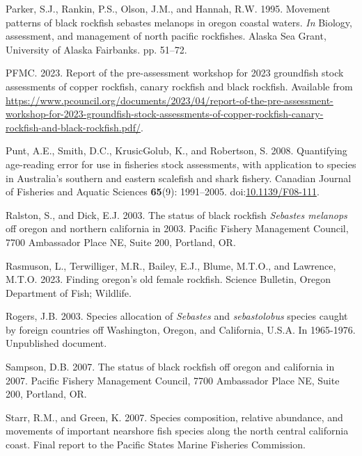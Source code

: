 \documentclass[11pt,
  english,
  letterpaper,
]{article}
\newlength{\cslhangindent}
\newenvironment{CSLReferences}[2] %
 {%
  \setlength{\parindent}{0pt}
  \ifodd #1 \everypar{\setlength{\hangindent}{\cslhangindent}}\ignorespaces\fi
  \ifnum #2 > 0
  \setlength{\parskip}{#2\baselineskip}
  \fi
 }%
 {}
\begin{document}
\begin{CSLReferences}{1}{0}
\leavevmode{}%
Parker, S.J., Rankin, P.S., Olson, J.M., and Hannah, R.W. 1995. Movement patterns of black rockfish sebastes melanops in oregon coastal waters. \emph{In} Biology, assessment, and management of north pacific rockfishes. Alaska Sea Grant, University of Alaska Fairbanks. pp. 51--72.

\leavevmode{}%
PFMC. 2023. Report of the pre-assessment workshop for 2023 groundfish stock assessments of copper rockfish, canary rockfish and black rockfish. Available from \url{https://www.pcouncil.org/documents/2023/04/report-of-the-pre-assessment-workshop-for-2023-groundfish-stock-assessments-of-copper-rockfish-canary-rockfish-and-black-rockfish.pdf/}.

\leavevmode{}%
Punt, A.E., Smith, D.C., KrusicGolub, K., and Robertson, S. 2008. Quantifying age-reading error for use in fisheries stock assessments, with application to species in {A}ustralia's southern and eastern scalefish and shark fishery. Canadian Journal of Fisheries and Aquatic Sciences \textbf{65}(9): 1991--2005. doi:\href{https://doi.org/10.1139/F08-111}{10.1139/F08-111}.

\leavevmode{}%
Ralston, S., and Dick, E.J. 2003. The status of black rockfish \emph{{Sebastes} melanops} off oregon and northern california in 2003. Pacific Fishery Management Council, 7700 Ambassador Place NE, Suite 200, Portland, OR.

\leavevmode{}%
Rasmuson, L., Terwilliger, M.R., Bailey, E.J., Blume, M.T.O., and Lawrence, M.T.O. 2023. Finding oregon's old female rockfish. Science Bulletin, Oregon Department of Fish; Wildlife.

\leavevmode{}%
Rogers, J.B. 2003. Species allocation of \emph{{Sebastes}} and \emph{sebastolobus} species caught by foreign countries off {Washington}, {Oregon}, and {California}, {U}.{S}.{A}. In 1965-1976. Unpublished document.

\leavevmode{}%
Sampson, D.B. 2007. The status of black rockfish off oregon and california in 2007. Pacific Fishery Management Council, 7700 Ambassador Place NE, Suite 200, Portland, OR.

\leavevmode{}%
Starr, R.M., and Green, K. 2007. Species composition, relative abundance, and movements of important nearshore fish species along the north central california coast. Final report to the Pacific States Marine Fisheries Commission.


\end{CSLReferences}
\end{document}
